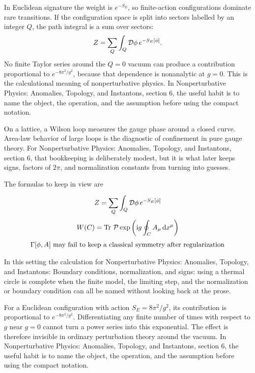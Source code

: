 In Euclidean signature the weight is \(e^{-S_E}\), so finite-action configurations dominate rare transitions.  If the configuration space is split into sectors labelled by an integer \(Q\), the path integral is a sum over sectors:
\[
  Z=\sum_Q\int_Q\mathcal D\phi\,e^{-S_E[\phi]}.
\]
No finite Taylor series around the \(Q=0\) vacuum can produce a contribution proportional to \(e^{-8\pi^2/g^2}\), because that dependence is nonanalytic at \(g=0\).  This is the calculational meaning of nonperturbative physics.  In Nonperturbative Physics: Anomalies, Topology, and Instantons, section 6, the useful habit is to name the object, the operation, and the assumption before using the compact notation.

On a lattice, a Wilson loop measures the gauge phase around a closed curve.  Area-law behavior of large loops is the diagnostic of confinement in pure gauge theory.  For Nonperturbative Physics: Anomalies, Topology, and Instantons, section 6, that bookkeeping is deliberately modest, but it is what later keeps signs, factors of \(2\pi\), and normalization constants from turning into guesses.

The formulas to keep in view are

\[
  Z=\sum_Q\int_Q\mathcal D\phi\,e^{-S_E[\phi]}
\]
\[
  W(C)=\operatorname{Tr}\,\mathcal P\exp\left(\mathrm i g\oint_C A_\mu\,\mathrm d x^\mu\right)
\]
\[
  \Gamma[\phi,A]\hbox{ may fail to keep a classical symmetry after regularization}
\]

In this setting the calculation for Nonperturbative Physics: Anomalies, Topology, and Instantons: Boundary conditions, normalization, and signs: using a thermal circle is complete when the finite model, the limiting step, and the normalization or boundary condition can all be named without looking back at the prose.




\begin{example}
For a Euclidean configuration with action \(S_E=8\pi^2/g^2\), its contribution is proportional to \(e^{-8\pi^2/g^2}\).  Differentiating any finite number of times with respect to \(g\) near \(g=0\) cannot turn a power series into this exponential.  The effect is therefore invisible in ordinary perturbation theory around the vacuum.  In Nonperturbative Physics: Anomalies, Topology, and Instantons, section 6, the useful habit is to name the object, the operation, and the assumption before using the compact notation.
\end{example}



